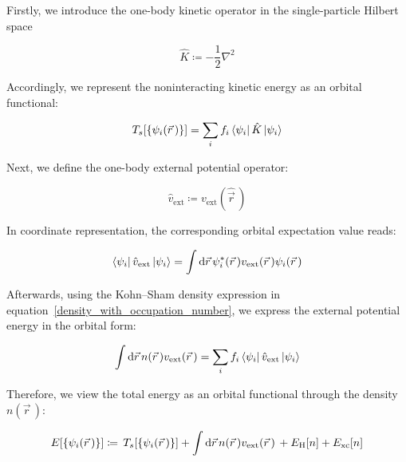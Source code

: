 Firstly, we introduce the one-body kinetic operator in the single-particle Hilbert space

\begin{equation}
    \hat{K}\coloneqq
    -\frac{1}{2}\nabla^2
\label{KS_one_body_kinetic_operator_definition}
\end{equation}

Accordingly, we represent the noninteracting kinetic energy as an orbital functional:

\begin{equation}
    T_s[\{\psi_i(\vec{r}\,)\}]=
    \sum_i f_i \bra{\psi_i}\hat{K}\ket{\psi_i}
\label{KS_noninteracting_kinetic_energy_orbital_functional}
\end{equation}

Next, we define the one-body external potential operator:

\begin{equation}
    \hat{v}_\mathrm{ext}\coloneqq
    v_\mathrm{ext}(\hat{\vec{r}}\,)
\label{KS_one_body_external_operator_definition}
\end{equation}

In coordinate representation, the corresponding orbital expectation value reads:

\begin{equation}
    \bra{\psi_i}\hat{v}_\mathrm{ext}\ket{\psi_i}=
    \int\mathrm{d}{\vec{r}}\,
    \psi_i^\ast(\vec{r}\,)v_\mathrm{ext}(\vec{r}\,)\psi_i(\vec{r}\,)
\label{KS_external_operator_expectation_coordinate}
\end{equation}

Afterwards, using the Kohn--Sham density expression in equation~\eqref{density_with_occupation_number},
we express the external potential energy in the orbital form:

\begin{equation}
    \int\mathrm{d}{\vec{r}}\,n(\vec{r}\,)v_\mathrm{ext}(\vec{r}\,)
    = \sum_{i}f_{i}\bra{\psi_i}\hat{v}_\mathrm{ext}\ket{\psi_i}
\label{KS_external_energy_orbital_form}
\end{equation}

Therefore, we view the total energy as an orbital functional through the density $n(\vec{r}\,)$:

\begin{equation}
    E[\{\psi_i(\vec{r}\,)\}]\coloneqq
    \,T_s[\{\psi_i(\vec{r}\,)\}]
    + \int \mathrm{d}{\vec{r}}\,
    n(\vec{r}\,)v_\mathrm{ext}(\vec{r}\,) 
    \,+ E_\mathrm{H}[n]
    + E_\mathrm{xc}[n]
\label{KS_total_energy_orbital_functional}
\end{equation}

